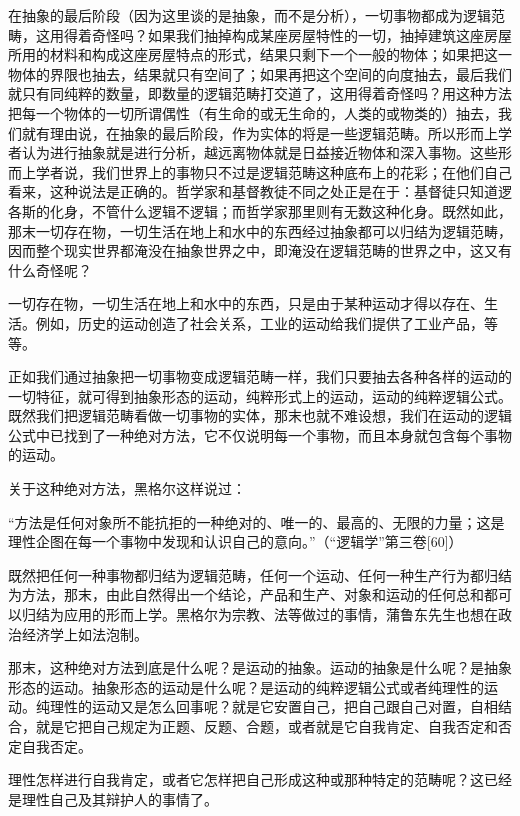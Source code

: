 \documentclass[a4paper,twoside,12pt,AutoFakeBold]{ctexart}
\begin{document}
在抽象的最后阶段（因为这里谈的是抽象，而不是分析），一切事物都成为逻辑范畴，这用得着奇怪吗？如果我们抽掉构成某座房屋特性的一切，抽掉建筑这座房屋所用的材料和构成这座房屋特点的形式，结果只剩下一个一般的物体；如果把这一物体的界限也抽去，结果就只有空间了；如果再把这个空间的向度抽去，最后我们就只有同纯粹的数量，即数量的逻辑范畴打交道了，这用得着奇怪吗？用这种方法把每一个物体的一切所谓偶性（有生命的或无生命的，人类的或物类的）抽去，我们就有理由说，在抽象的最后阶段，作为实体的将是一些逻辑范畴。所以形而上学者认为进行抽象就是进行分析，越远离物体就是日益接近物体和深入事物。这些形而上学者说，我们世界上的事物只不过是逻辑范畴这种底布上的花彩；在他们自己看来，这种说法是正确的。哲学家和基督教徒不同之处正是在于：基督徒只知道逻各斯的化身，不管什么逻辑不逻辑；而哲学家那里则有无数这种化身。既然如此，那末一切存在物，一切生活在地上和水中的东西经过抽象都可以归结为逻辑范畴，因而整个现实世界都淹没在抽象世界之中，即淹没在逻辑范畴的世界之中，这又有什么奇怪呢？

一切存在物，一切生活在地上和水中的东西，只是由于某种运动才得以存在、生活。例如，历史的运动创造了社会关系，工业的运动给我们提供了工业产品，等等。

正如我们通过抽象把一切事物变成逻辑范畴一样，我们只要抽去各种各样的运动的一切特征，就可得到抽象形态的运动，纯粹形式上的运动，运动的纯粹逻辑公式。既然我们把逻辑范畴看做一切事物的实体，那末也就不难设想，我们在运动的逻辑公式中已找到了一种绝对方法，它不仅说明每一个事物，而且本身就包含每个事物的运动。

关于这种绝对方法，黑格尔这样说过：

\begin{fangsong}
    “方法是任何对象所不能抗拒的一种绝对的、唯一的、最高的、无限的力量；这是理性企图在每一个事物中发现和认识自己的意向。”（“逻辑学”第三卷[60]）
\end{fangsong}

既然把任何一种事物都归结为逻辑范畴，任何一个运动、任何一种生产行为都归结为方法，那末，由此自然得出一个结论，产品和生产、对象和运动的任何总和都可以归结为应用的形而上学。黑格尔为宗教、法等做过的事情，蒲鲁东先生也想在政治经济学上如法泡制。

那末，这种绝对方法到底是什么呢？是运动的抽象。运动的抽象是什么呢？是抽象形态的运动。抽象形态的运动是什么呢？是运动的纯粹逻辑公式或者纯理性的运动。纯理性的运动又是怎么回事呢？就是它安置自己，把自己跟自己对置，自相结合，就是它把自己规定为正题、反题、合题，或者就是它自我肯定、自我否定和否定自我否定。

理性怎样进行自我肯定，或者它怎样把自己形成这种或那种特定的范畴呢？这已经是理性自己及其辩护人的事情了。
\end{document}
